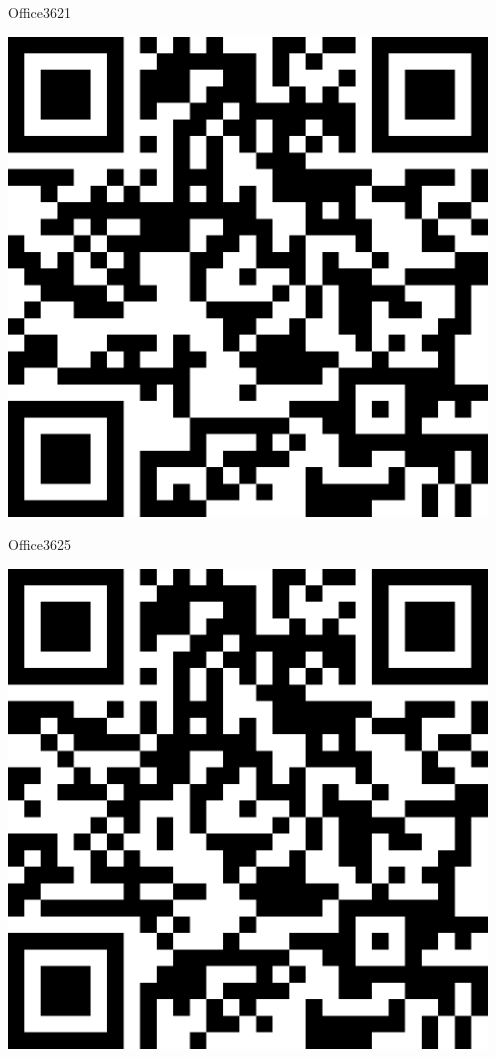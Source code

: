 \documentclass[letterpaper]{article}
\begin{document}
 \hfill{\small Office3621} 

 \vspace{1in} 
 \pagebreak 
{} 
 \vspace*{\fill} 
 \begingroup 
 \centerline{\includegraphics[scale=1,width=5in,height=5in]{Office3625.png}} 
 \endgroup 
 \vspace*{\fill} 

 \hfill{\small Office3625} 

 \vspace{1in} 
 \pagebreak 
{} 
 \vspace*{\fill} 
 \begingroup 
 \centerline{\includegraphics[scale=1,width=5in,height=5in]{Office3627.png}} 
 \endgroup 
 \vspace*{\fill} 
\end{document}
